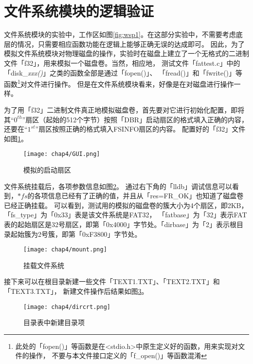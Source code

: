 \section{文件系统模块的逻辑验证}
\label{sec:ExpFAT}
文件系统模块的实验中，工作区如图\ref{fig:wsp1}。在这部分实验中，不需要考虑底层的情况，只需要相应函数功能在逻辑上能够正确无误的达成即可。
因此，为了模拟文件系统模块对物理磁盘的操作，实验时在磁盘上建立了一个无格式的二进制文件「f32」，用来模拟一个磁盘卷。当然，相应地，
测试文件「fattest.c」中的「disk\_\textit{xxx()}」之类的函数全部是通过「fopen()」、
「fread()」和「fwrite()」等函数\footnote{此处的「fopen()」等函数是在<stdio.h>中原生定义好的函数，用来实现对文件的操作，
不要与本文件接口定义的「f\_open()」等函数混淆}对文件进行操作。
但是在文件系统模块看来，好像是在对磁盘进行操作一样。

为了用「f32」二进制文件真正地模拟磁盘卷，首先要对它进行初始化配置，即将其“$0^{th}$”扇区（起始的512个字节）按照「DBR」启动扇区的格式填入正确的内容，
还要在“$1^{st}$”扇区按照正确的格式填入FSINFO扇区的内容。
配置好的「f32」文件如图\ref{fig:GUI}。

\begin{figure}[!htbp]
    \centering
    \texttt{[image: chap4/GUI.png]}
    \\
    \caption{模拟的启动扇区} \label{fig:GUI}
\end{figure}

文件系统挂载后，各项参数信息如图\ref{fig:mount}。
通过右下角的「lldb」调试信息可以看到，$*fs$的各项信息已经有了正确的值，并且从「res=FR\_OK」也知道了磁盘卷已经正确挂载。
可以看到，测试用的模拟的磁盘卷的簇大小为4个扇区，即2KB，「fs\_type」为「0x33」表是该文件系统是FAT32，
「fatbase」为「32」表示FAT表的起始扇区是32号扇区，即第「0x4000」字节处。「dirbase」为「2」表示根目录起始簇为2号簇，即第「0xF3800」字节处。

\begin{figure}[!htbp]
    \centering
    \texttt{[image: chap4/mount.png]}
    \\
    \caption{挂载文件系统} \label{fig:mount}
\end{figure}

接下来可以在根目录新建一些文件「TEXT1.TXT」、「TEXT2.TXT」和「TEXT3.TXT」，
新建文件操作后结果如图\ref{fig:dircrt}。

\begin{figure}[!htbp]
    \centering
    \texttt{[image: chap4/dircrt.png]}
    \\
    \caption{目录表中新建目录项} \label{fig:dircrt}
\end{figure}

